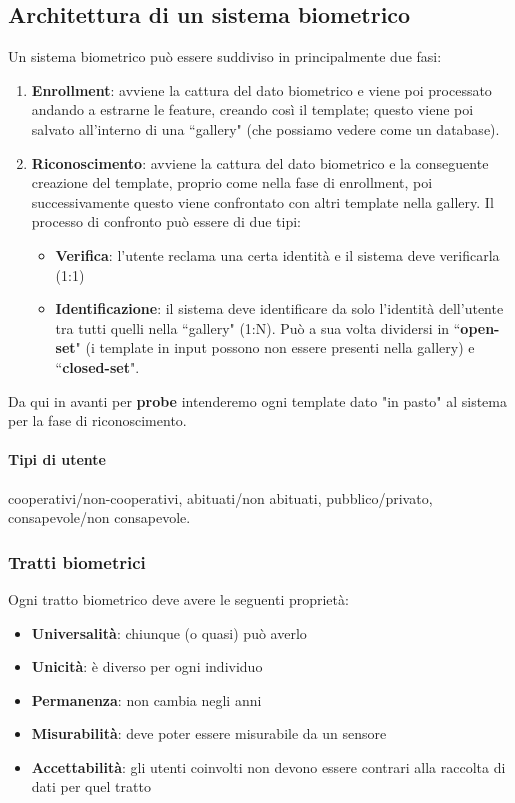 \documentclass{article}
\begin{document}
\subsection{Architettura di un sistema biometrico}
Un sistema biometrico può essere suddiviso in principalmente due fasi:
\begin{enumerate}
    \item \textbf{Enrollment}: avviene la cattura del dato biometrico e viene poi processato andando a estrarne le feature, creando così il template; questo viene poi salvato all'interno di una ``gallery" (che possiamo vedere come un database).
    \item \textbf{Riconoscimento}: avviene la cattura del dato biometrico e la conseguente creazione del template, proprio come nella fase di enrollment, poi successivamente questo viene confrontato con altri template nella gallery. Il processo di confronto può essere di due tipi: 
    \begin{itemize}
        \item \textbf{Verifica}: l'utente reclama una certa identità e il sistema deve verificarla (1:1)
        \item \textbf{Identificazione}: il sistema deve identificare da solo l'identità dell'utente tra tutti quelli nella ``gallery" (1:N). Può a sua volta dividersi in ``\textbf{open-set}" (i template in input possono non essere presenti nella gallery) e ``\textbf{closed-set}".
    \end{itemize}
\end{enumerate}

Da qui in avanti per \textbf{probe} intenderemo ogni template dato "in pasto" al sistema per la fase di riconoscimento.

\paragraph{Tipi di utente} cooperativi/non-cooperativi, abituati/non abituati, pubblico/privato, consapevole/non consapevole.

\subsubsection{Tratti biometrici}
Ogni tratto biometrico deve avere le seguenti proprietà:
\begin{itemize}
    \item \textbf{Universalità}: chiunque (o quasi) può averlo
    \item \textbf{Unicità}: è diverso per ogni individuo
    \item \textbf{Permanenza}: non cambia negli anni
    \item \textbf{Misurabilità}: deve poter essere misurabile da un sensore
    \item \textbf{Accettabilità}: gli utenti coinvolti non devono essere contrari alla raccolta di dati per quel tratto
\end{itemize}
\end{document}
